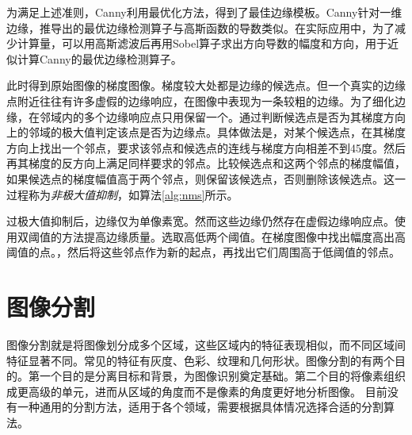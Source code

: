 为满足上述准则，Canny利用最优化方法，得到了最佳边缘模板。Canny针对一维边缘，推导出的最优边缘检测算子与高斯函数的导数类似。在实际应用中，为了减少计算量，可以用高斯滤波后再用Sobel算子求出方向导数的幅度和方向，用于近似计算Canny的最优边缘检测算子。

此时得到原始图像的梯度图像。梯度较大处都是边缘的候选点。但一个真实的边缘点附近往往有许多虚假的边缘响应，在图像中表现为一条较粗的边缘。为了细化边缘，在邻域内的多个边缘响应点只用保留一个。通过判断候选点是否为其梯度方向上的邻域的极大值判定该点是否为边缘点。具体做法是，对某个候选点，在其梯度方向上找出一个邻点，要求该邻点和候选点的连线与梯度方向相差不到45度。然后再其梯度的反方向上满足同样要求的邻点。比较候选点和这两个邻点的梯度幅值，如果候选点的梯度幅值高于两个邻点，则保留该候选点，否则删除该候选点。这一过程称为\emph{非极大值抑制}，如算法\ref{alg:nms}所示。

过极大值抑制后，边缘仅为单像素宽。然而这些边缘仍然存在虚假边缘响应点。使用双阈值的方法提高边缘质量。选取高低两个阈值。在梯度图像中找出幅度高出高阈值的点。，然后将这些邻点作为新的起点，再找出它们周围高于低阈值的邻点。

\section{图像分割}

图像分割就是将图像划分成多个区域，这些区域内的特征表现相似，而不同区域间特征显著不同。常见的特征有灰度、色彩、纹理和几何形状。图像分割的有两个目的。第一个目的是分离目标和背景，为图像识别奠定基础。第二个目的将像素组织成更高级的单元，进而从区域的角度而不是像素的角度更好地分析图像。
目前没有一种通用的分割方法，适用于各个领域，需要根据具体情况选择合适的分割算法。

